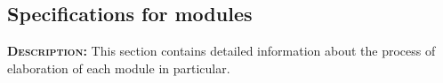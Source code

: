\subsection{Specifications for modules}
	\textsc{\textbf{Description:}} This section contains detailed information about the process of elaboration of each module in particular.
	
	
	
	
	
	
	
	
